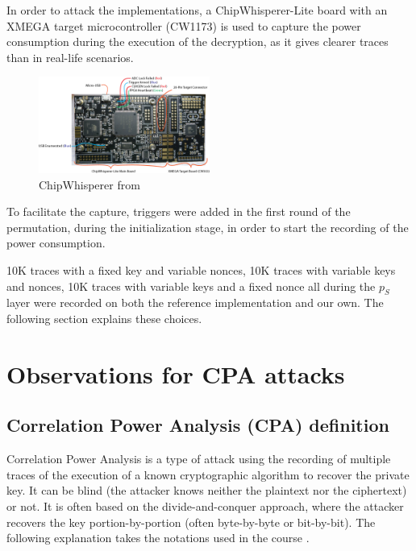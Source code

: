 \documentclass[11pt,technote]{IEEEtran}
\begin{document}
		In order to attack the implementations, a ChipWhisperer-Lite board with an XMEGA target microcontroller (CW1173) is used to capture the power consumption during the execution of the decryption, as it gives clearer traces than in real-life scenarios.
		
		\begin{figure}[h]
			\includegraphics[width=0.5\textwidth]{img_files/cwlite_basic1}
			\caption{ChipWhisperer from \cite{cwdoc}}
			\label{fig:cw}
		\end{figure}
		
		To facilitate the capture, triggers were added in the first round of the permutation, during the initialization stage, in order to start the recording of the power consumption.
		
		10K traces with a fixed key and variable nonces, 10K traces with variable keys and nonces, 10K traces with variable keys and a fixed nonce all during the $p_S$ layer were recorded on both the reference implementation and our own. The following section explains these choices.
		
		\section{Observations for CPA attacks}
		\subsection{Correlation Power Analysis (CPA) definition}
		Correlation Power Analysis\cite{cpa_aes} is a type of attack using the recording of multiple traces of the execution of a known cryptographic algorithm to recover the private key. It can be blind (the attacker knows neither the plaintext nor the ciphertext) or not. It is often based on the divide-and-conquer approach, where the attacker recovers the key portion-by-portion (often byte-by-byte or bit-by-bit). The following explanation takes the notations used in the course \cite{cours}.
		
\end{document}
